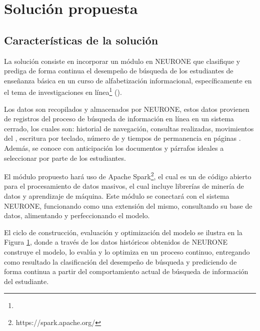 \section{Solución propuesta}
\label{sec:solucion_propuesta}

\subsection{Características de la solución}
\label{subsec:caracteristicas-solucion}
La solución consiste en incorporar un módulo en NEURONE \parencite{gonzalez2017neurone} que clasifique y prediga de forma continua el desempeño de búsqueda de los estudiantes de enseñanza básica en un curso de alfabetización informacional, específicamente en el tema de investigaciones en línea\footnote{\traduccionlibre} (). 

Los datos son recopilados y almacenados por NEURONE, estos datos provienen de registros del proceso de búsqueda de información en línea en un sistema cerrado, los cuales son: historial de navegación, consultas realizadas, movimientos del , escritura por teclado, número de  y tiempos de permanencia en páginas . Además, se conoce con anticipación los documentos y párrafos ideales a seleccionar por parte de los estudiantes.

El módulo propuesto hará uso de Apache Spark\footnote{https://spark.apache.org/}, el cual es un  de código abierto para el procesamiento de datos masivos, el cual incluye librerías de minería de datos y aprendizaje de máquina. Este módulo se conectará con el sistema NEURONE, funcionando como una extensión del mismo, consultando su base de datos, alimentando y perfeccionando el modelo. 

El ciclo de construcción, evaluación y optimización del modelo se ilustra en la Figura \ref{fig:ml-pipeline}, donde a través de los datos históricos obtenidos de NEURONE construye el modelo, lo evalúa y lo optimiza en un proceso continuo, entregando como resultado la clasificación del desempeño de búsqueda y prediciendo de forma continua a partir del comportamiento actual de búsqueda de información del estudiante.

\begin{figure}[H]
	\centering
	\scalebox{0.8}{}
	\label{fig:ml-pipeline}
\end{figure}


